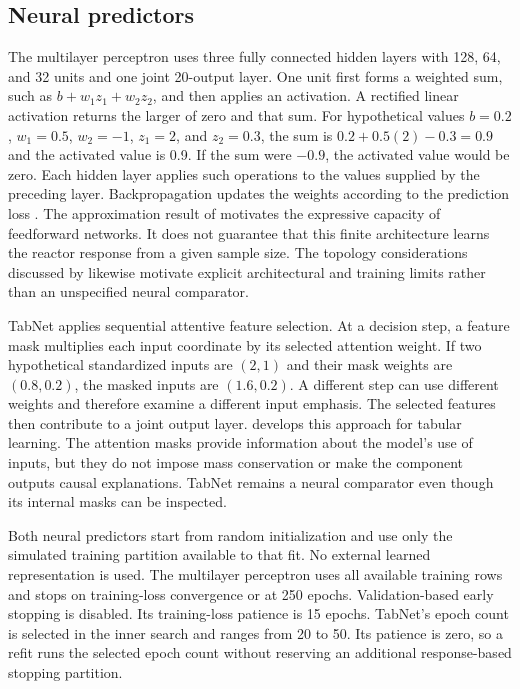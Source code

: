 \subsection{Neural predictors}

The multilayer perceptron uses three fully connected hidden layers with 128, 64, and 32 units and one joint 20-output layer. One unit first forms a weighted sum, such as $b+w_1z_1+w_2z_2$, and then applies an activation. A rectified linear activation returns the larger of zero and that sum. For hypothetical values $b=0.2$, $w_1=0.5$, $w_2=-1$, $z_1=2$, and $z_2=0.3$, the sum is $0.2+0.5(2)-0.3=0.9$ and the activated value is 0.9. If the sum were $-0.9$, the activated value would be zero. Each hidden layer applies such operations to the values supplied by the preceding layer. Backpropagation updates the weights according to the prediction loss \citep{Rumelhart1986}. The approximation result of \citet{Hornik1989} motivates the expressive capacity of feedforward networks. It does not guarantee that this finite architecture learns the reactor response from a given sample size. The topology considerations discussed by \citet{Curteanu2011} likewise motivate explicit architectural and training limits rather than an unspecified neural comparator.

TabNet applies sequential attentive feature selection. At a decision step, a feature mask multiplies each input coordinate by its selected attention weight. If two hypothetical standardized inputs are $(2,1)$ and their mask weights are $(0.8,0.2)$, the masked inputs are $(1.6,0.2)$. A different step can use different weights and therefore examine a different input emphasis. The selected features then contribute to a joint output layer. \citet{ArikPfister2021} develops this approach for tabular learning. The attention masks provide information about the model's use of inputs, but they do not impose mass conservation or make the component outputs causal explanations. TabNet remains a neural comparator even though its internal masks can be inspected.

Both neural predictors start from random initialization and use only the simulated training partition available to that fit. No external learned representation is used. The multilayer perceptron uses all available training rows and stops on training-loss convergence or at 250 epochs. Validation-based early stopping is disabled. Its training-loss patience is 15 epochs. TabNet's epoch count is selected in the inner search and ranges from 20 to 50. Its patience is zero, so a refit runs the selected epoch count without reserving an additional response-based stopping partition.

